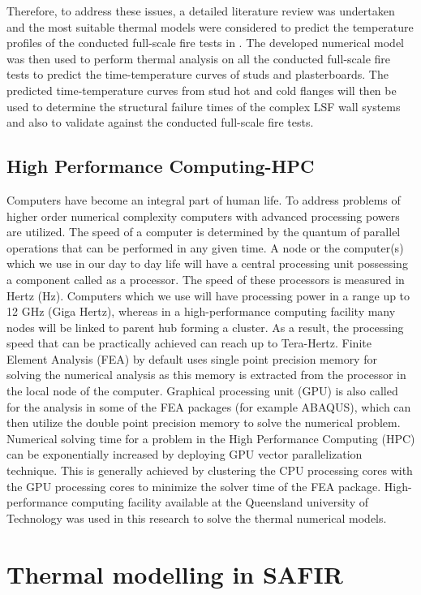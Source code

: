 Therefore, to address these issues, a detailed literature review was undertaken and the most suitable thermal models were considered to predict the temperature profiles of the conducted full-scale fire tests in . The developed numerical model was then used to perform thermal analysis on all the conducted full-scale fire tests to predict the time-temperature curves of studs and plasterboards. The predicted time-temperature curves from stud hot and cold flanges will then be used to determine the structural failure times of the complex LSF wall systems and also to validate against the conducted full-scale fire tests. 

\subsection{High Performance Computing-HPC}

Computers have become an integral part of human life. To address problems of higher order numerical complexity computers with advanced processing powers are utilized. The speed of a computer is determined by the quantum of parallel operations that can be performed in any given time. A node or the computer(s) which we use in our day to day life will have a central processing unit possessing a component called as a processor. The speed of these processors is measured in Hertz (Hz). Computers which we use will have processing power in a range up to 12 GHz (Giga Hertz), whereas in a high-performance computing facility many nodes will be linked to parent hub forming a cluster. As a result, the processing speed that can be practically achieved can reach up to Tera-Hertz. Finite Element Analysis (FEA) by default uses single point precision memory for solving the numerical analysis as this memory is extracted from the processor in the local node of the computer. Graphical processing unit (GPU) is also called for the analysis in some of the FEA packages (for example ABAQUS), which can then utilize the double point precision memory to solve the numerical problem. Numerical solving time for a problem in the High Performance Computing (HPC) can be exponentially increased by deploying GPU vector parallelization technique. This is generally achieved by clustering the CPU processing cores with the GPU processing cores to minimize the solver time of the FEA package. High-performance computing facility available at the Queensland university of Technology was used in this research to solve the thermal numerical models.

\section{Thermal modelling in SAFIR}

